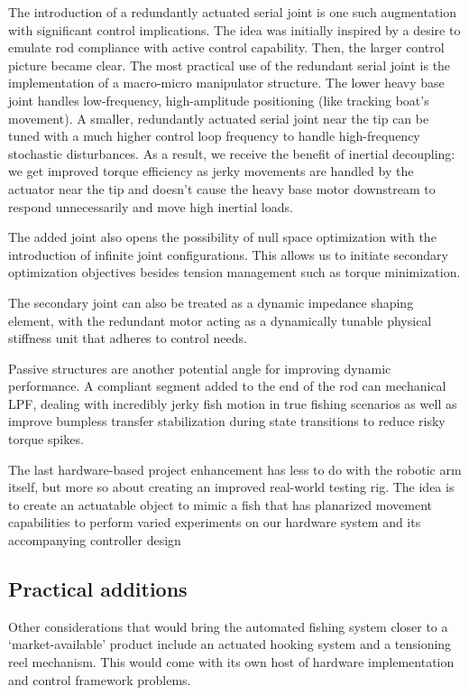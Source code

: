 \documentclass[conference]{IEEEtran}
\begin{document}
The introduction of a redundantly actuated serial joint is one such augmentation with significant control implications. The idea was initially inspired by a desire to emulate rod compliance with active control capability. Then, the larger control picture became clear. The most practical use of the redundant serial joint is the implementation of a macro-micro manipulator structure. The lower heavy base joint handles low-frequency, high-amplitude positioning (like tracking boat's movement). A smaller, redundantly actuated serial joint near the tip can be tuned with a much higher control loop frequency to handle high-frequency stochastic disturbances. As a result, we receive the benefit of inertial decoupling: we get improved torque efficiency as jerky movements are handled by the actuator near the tip and doesn’t cause the heavy base motor downstream to respond unnecessarily and move high inertial loads.

The added joint also opens the possibility of null space optimization with the introduction of infinite joint configurations. This allows us to initiate secondary optimization objectives besides tension management such as torque minimization.

The secondary joint can also be treated as a dynamic impedance shaping element, with the redundant motor acting as a dynamically tunable physical stiffness unit that adheres to control needs.

Passive structures are another potential angle for improving dynamic performance. A compliant segment added to the end of the rod can mechanical LPF, dealing with incredibly jerky fish motion in true fishing scenarios as well as improve bumpless transfer stabilization during state transitions to reduce risky torque spikes.

The last hardware-based project enhancement has less to do with the robotic arm itself, but more so about creating an improved real-world testing rig. The idea is to create an actuatable object to mimic a fish that has planarized movement capabilities to perform varied experiments on our hardware system and its accompanying controller design

\subsection{Practical additions}
Other considerations that would bring the automated fishing system closer to a ‘market-available’ product include an actuated hooking system and a tensioning reel mechanism. This would come with its own host of hardware implementation and control framework problems.
\end{document}
